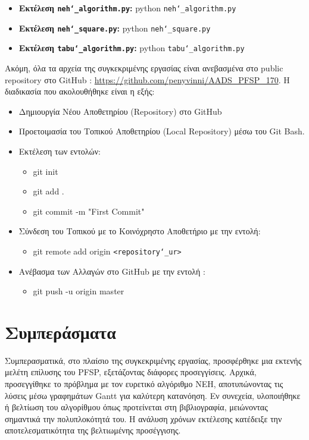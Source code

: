 \documentclass[paper=a4, fontsize=11pt]{scrartcl}
\numberwithin{equation}{section}		%
\numberwithin{figure}{section}			%
\numberwithin{table}{section}				%
\begin{document}
\begin{itemize}
  \item \textbf{Εκτέλεση \texttt{neh\char`_algorithm.py}:} python \texttt{neh\char`_algorithm.py}
  \item \textbf{Εκτέλεση \texttt{neh\char`_square.py}:} python \texttt{neh\char`_square.py}
  \item \textbf{Εκτέλεση \texttt{tabu\char`_algorithm.py}:} python \texttt{tabu\char`_algorithm.py}
\end{itemize}

    Ακόμη, όλα τα αρχεία της συγκεκριμένης εργασίας είναι ανεβασμένα στο public repository στο GitHub : \url{https://github.com/penyvinni/AADS_PFSP_170}. Η διαδικασία που ακολουθήθηκε είναι η εξής:
    
\begin{itemize}
  \item Δημιουργία Νέου Αποθετηρίου (Repository) στο GitHub
  \item Προετοιμασία του Τοπικού Αποθετηρίου (Local Repository) μέσω του Git Bash.
  \item Εκτέλεση των εντολών: 
  \begin{itemize}
     \item git init
     \item git add .
     \item git commit -m "First Commit" 
  \end{itemize}
  \item Σύνδεση του Τοπικού με το Κοινόχρηστο Αποθετήριο με την εντολή:
   \begin{itemize}
     \item git remote add origin \texttt{<repository\char`_ur>}
  \end{itemize}
  \item Ανέβασμα των Αλλαγών στο GitHub με την εντολή :
     \begin{itemize}
     \item git push -u origin master 
  \end{itemize}
\end{itemize}


\newpage
\section{Συμπεράσματα}

    Συμπερασματικά, στο πλαίσιο της συγκεκριμένης εργασίας, προσφέρθηκε μια εκτενής μελέτη επίλυσης του PFSP, εξετάζοντας διάφορες προσεγγίσεις. Αρχικά, προσεγγίθηκε το πρόβλημα με τον ευρετικό αλγόριθμο NEH, αποτυπώνοντας τις λύσεις μέσω γραφημάτων Gantt για καλύτερη κατανόηση. Εν συνεχεία, υλοποιήθηκε ή βελτίωση του αλγορίθμου όπως προτείνεται στη βιβλιογραφία, μειώνοντας σημαντικά την πολυπλοκότητά του. Η ανάλυση χρόνων εκτέλεσης κατέδειξε την αποτελεσματικότητα της βελτιωμένης προσέγγισης.
    
\end{document}
